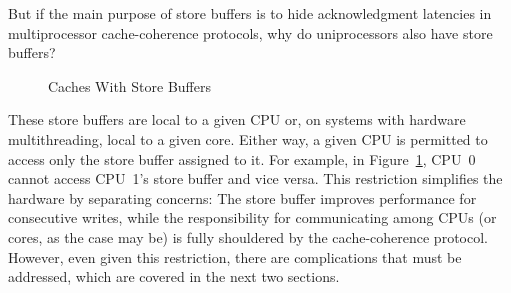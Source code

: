 \QuickQuiz{}
	But if the main purpose of store buffers is to hide acknowledgment
	latencies in multiprocessor cache-coherence protocols, why
	do uniprocessors also have store buffers?
 \QuickQuizEnd

\begin{figure}[htb]
\begin{center}
\end{center}
\caption{Caches With Store Buffers}
\label{fig:app:whymb:Caches With Store Buffers}
\end{figure}

These store buffers are local to a given CPU or, on systems with
hardware multithreading, local to a given core.
Either way, a given CPU is permitted to access only the store buffer
assigned to it.
For example, in
Figure~\ref{fig:app:whymb:Caches With Store Buffers}, CPU~0 cannot
access CPU~1's store buffer and vice versa.
This restriction simplifies the hardware by separating concerns:
The store buffer improves performance for consecutive writes, while
the responsibility for communicating among CPUs (or cores, as the
case may be) is fully shouldered by the cache-coherence protocol.
However, even given this restriction, there are complications that must
be addressed, which are covered in the next two sections.

